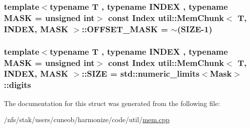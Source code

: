 \hypertarget{structutil_1_1MemChunk_a368c2094ff243b97cb21dc0bf684e653}{
\subsubsection[{O\-F\-F\-S\-E\-T\-\_\-\-M\-A\-S\-K}]{\setlength{\rightskip}{0pt plus 5cm}template$<$typename T , typename I\-N\-D\-E\-X , typename M\-A\-S\-K  = unsigned int$>$ const {\bf Index} {\bf util\-::\-Mem\-Chunk}$<$ T, I\-N\-D\-E\-X, M\-A\-S\-K $>$\-::O\-F\-F\-S\-E\-T\-\_\-\-M\-A\-S\-K = $\sim$({\bf S\-I\-Z\-E}-\/1)\hspace{0.3cm}{\ttfamily [static]}}}\label{structutil_1_1MemChunk_a368c2094ff243b97cb21dc0bf684e653}
\hypertarget{structutil_1_1MemChunk_af23d23ae810e7d52f138dd5a37a897ff}{
\subsubsection[{S\-I\-Z\-E}]{\setlength{\rightskip}{0pt plus 5cm}template$<$typename T , typename I\-N\-D\-E\-X , typename M\-A\-S\-K  = unsigned int$>$ const {\bf Index} {\bf util\-::\-Mem\-Chunk}$<$ T, I\-N\-D\-E\-X, M\-A\-S\-K $>$\-::S\-I\-Z\-E = std\-::numeric\-\_\-limits$<${\bf Mask}$>$\-::digits\hspace{0.3cm}{\ttfamily [static]}}}\label{structutil_1_1MemChunk_af23d23ae810e7d52f138dd5a37a897ff}


The documentation for this struct was generated from the following file\-:\begin{DoxyCompactItemize}
\item 
/nfs/stak/users/cuneob/harmonize/code/util/\hyperlink{mem_8cpp}{mem.\-cpp}\end{DoxyCompactItemize}
